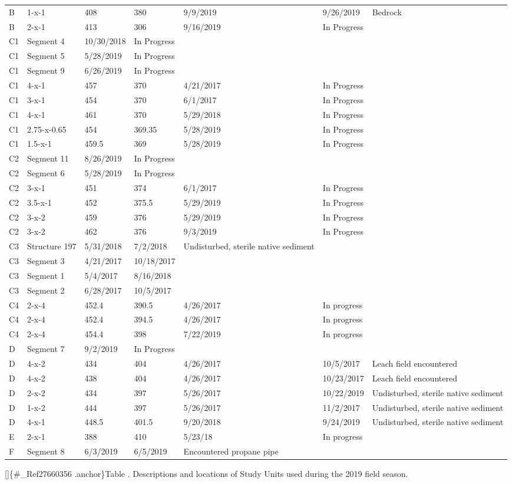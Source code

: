 \documentclass[
  12pt,
]{krantz}
\begin{document}
\begin{longtable}[]{@{}lllllll@{}}
B & 1-x-1 & 408 & 380 & 9/9/2019 & 9/26/2019 & Bedrock\tabularnewline
B & 2-x-1 & 413 & 306 & 9/16/2019 & In Progress &\tabularnewline
C1 & Segment 4 & 10/30/2018 & In Progress & & &\tabularnewline
C1 & Segment 5 & 5/28/2019 & In Progress & & &\tabularnewline
C1 & Segment 9 & 6/26/2019 & In Progress & & &\tabularnewline
C1 & 4-x-1 & 457 & 370 & 4/21/2017 & In Progress &\tabularnewline
C1 & 3-x-1 & 454 & 370 & 6/1/2017 & In Progress &\tabularnewline
C1 & 4-x-1 & 461 & 370 & 5/29/2018 & In Progress &\tabularnewline
C1 & 2.75-x-0.65 & 454 & 369.35 & 5/28/2019 & In Progress &\tabularnewline
C1 & 1.5-x-1 & 459.5 & 369 & 5/28/2019 & In Progress &\tabularnewline
C2 & Segment 11 & 8/26/2019 & In Progress & & &\tabularnewline
C2 & Segment 6 & 5/28/2019 & In Progress & & &\tabularnewline
C2 & 3-x-1 & 451 & 374 & 6/1/2017 & In Progress &\tabularnewline
C2 & 3.5-x-1 & 452 & 375.5 & 5/29/2019 & In Progress &\tabularnewline
C2 & 3-x-2 & 459 & 376 & 5/29/2019 & In Progress &\tabularnewline
C2 & 3-x-2 & 462 & 376 & 9/3/2019 & In Progress &\tabularnewline
C3 & Structure 197 & 5/31/2018 & 7/2/2018 & Undisturbed, sterile native sediment & &\tabularnewline
C3 & Segment 3 & 4/21/2017 & 10/18/2017 & & &\tabularnewline
C3 & Segment 1 & 5/4/2017 & 8/16/2018 & & &\tabularnewline
C3 & Segment 2 & 6/28/2017 & 10/5/2017 & & &\tabularnewline
C4 & 2-x-4 & 452.4 & 390.5 & 4/26/2017 & In progress &\tabularnewline
C4 & 2-x-4 & 452.4 & 394.5 & 4/26/2017 & In progress &\tabularnewline
C4 & 2-x-4 & 454.4 & 398 & 7/22/2019 & In progress &\tabularnewline
D & Segment 7 & 9/2/2019 & In Progress & & &\tabularnewline
D & 4-x-2 & 434 & 404 & 4/26/2017 & 10/5/2017 & Leach field encountered\tabularnewline
D & 4-x-2 & 438 & 404 & 4/26/2017 & 10/23/2017 & Leach field encountered\tabularnewline
D & 2-x-2 & 434 & 397 & 5/26/2017 & 10/22/2019 & Undisturbed, sterile native sediment\tabularnewline
D & 1-x-2 & 444 & 397 & 5/26/2017 & 11/2/2017 & Undisturbed, sterile native sediment\tabularnewline
D & 4-x-1 & 448.5 & 401.5 & 9/20/2018 & 9/24/2019 & Undisturbed, sterile native sediment\tabularnewline
E & 2-x-1 & 388 & 410 & 5/23/18 & In progress &\tabularnewline
F & Segment 8 & 6/3/2019 & 6/5/2019 & Encountered propane pipe & &\tabularnewline
\bottomrule
\end{longtable}

{[}{]}\{\#\_Ref27660356 .anchor\}Table . Descriptions and locations of Study
Units used during the 2019 field season.
\end{document}
